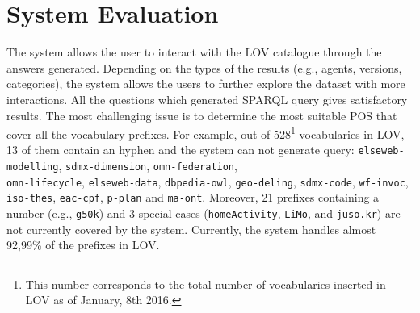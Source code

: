 \documentclass[runningheads,a4paper]{llncs}
\newcommand{\todo}[1]{\noindent\textcolor{red}{{\bf \{TODO}: #1{\bf \}}}}
\begin{document}




\section{System Evaluation}
\label{sec:evaluation}

The system allows the user to interact with the LOV catalogue through the answers generated. Depending on the types of the results (e.g., agents, versions, categories), the system allows the users to further explore the dataset with more interactions.
All the questions which generated SPARQL query gives satisfactory results. The most challenging issue is to determine the most suitable POS that cover all the vocabulary prefixes. For example, out of 528\footnote{This number corresponds to the total number of vocabularies inserted in LOV as of January, 8th 2016.} vocabularies in LOV, 13 of them contain an hyphen and the system can not generate query: \texttt{elseweb-modelling}, \texttt{sdmx-dimension}, \texttt{omn-federation}, \\ \texttt{omn-lifecycle}, \texttt{elseweb-data}, \texttt{dbpedia-owl}, \texttt{geo-deling}, \texttt{sdmx-code}, \texttt{wf-invoc}, \texttt{iso-thes}, \texttt{eac-cpf}, \texttt{p-plan} and \texttt{ma-ont}. Moreover, 21 prefixes containing a number (e.g., \texttt{g50k}) and 3 special cases (\texttt{homeActivity}, \texttt{LiMo}, and \texttt{juso.kr}) are not currently covered by the system. Currently, the system handles almost 92,99\% of the prefixes in LOV.


\end{document}
